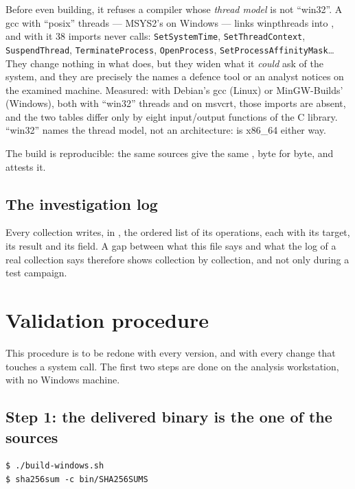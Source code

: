 \documentclass[11pt,a4paper,oneside]{report}
\begin{document}
Before even building, it refuses a compiler whose \emph{thread model} is not
``win32''. A gcc with ``posix'' threads — MSYS2's on Windows — links
winpthreads into , and with it 38 imports \wac{} never
calls: \texttt{SetSystemTime}, \texttt{SetThreadContext},
\texttt{SuspendThread}, \texttt{TerminateProcess}, \texttt{OpenProcess},
\texttt{SetProcessAffinityMask}\ldots{} They change nothing in what \wac{}
does, but they widen what it \emph{could} ask of the system, and they are
precisely the names a defence tool or an analyst notices on the examined
machine. Measured: with Debian's gcc (Linux) or MinGW-Builds' (Windows), both
with ``win32'' threads and on msvcrt, those imports are absent, and the two
tables differ only by eight input/output functions of the C library.
``win32'' names the thread model, not an architecture:  is
x86\_64 either way.

The build is reproducible: the same sources give the same ,
byte for byte, and  attests it.

\section{The investigation log}

Every collection writes, in , the ordered list of
its operations, each with its target, its result and its 
field. A gap between what this file says and what the log of a real
collection says therefore shows collection by collection, and not only during
a test campaign.

\chapter{Validation procedure}\label{ch:procedure}

This procedure is to be redone with every version, and with every change that
touches a system call. The first two steps are done on the analysis
workstation, with no Windows machine.

\section{Step 1: the delivered binary is the one of the sources}

\begin{lstlisting}
$ ./build-windows.sh
$ sha256sum -c bin/SHA256SUMS
\end{lstlisting}
\end{document}
